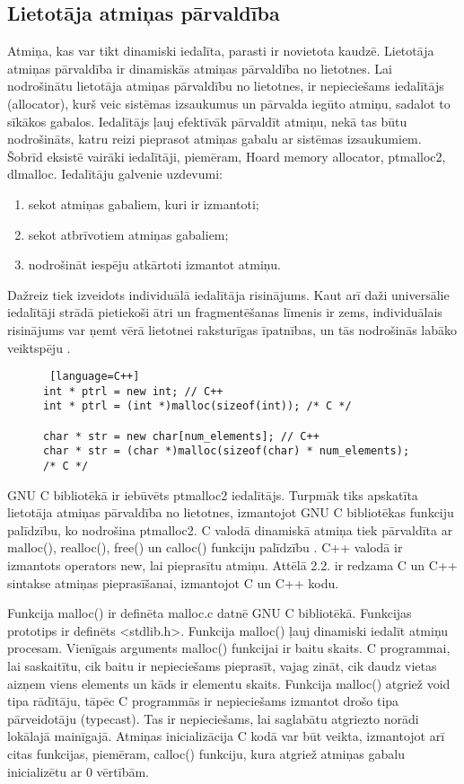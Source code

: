  
\subsection{Lietotāja atmiņas pārvaldība}
Atmiņa, kas var tikt dinamiski iedalīta, parasti ir novietota kaudzē. 
Lietotāja atmiņas pārvaldība ir dinamiskās atmiņas pārvaldība no lietotnes.
Lai nodrošinātu lietotāja atmiņas pārvaldību no lietotnes, ir nepieciešams iedalītājs (allocator), kurš veic sistēmas izsaukumus un pārvalda iegūto atmiņu, sadalot to sīkākos gabalos.
Iedalītājs ļauj efektīvāk pārvaldīt atmiņu, nekā tas būtu nodrošināts, katru reizi pieprasot atmiņas gabalu ar sistēmas izsaukumiem.
Šobrīd eksistē vairāki iedalītāji, piemēram, Hoard memory allocator, ptmalloc2, dlmalloc.
Iedalītāju galvenie uzdevumi: 
\begin{enumerate}
\item sekot atmiņas gabaliem, kuri ir izmantoti;
\item sekot atbrīvotiem atmiņas gabaliem;
\item nodrošināt iespēju atkārtoti izmantot atmiņu.
\end{enumerate}
Dažreiz tiek izveidots individuālā iedalītāja risinājums. 
Kaut arī daži universālie iedalītāji strādā pietiekoši ātri un fragmentēšanas līmenis ir zems, individuālais risinājums var ņemt vērā lietotnei raksturīgas īpatnības, un tās nodrošinās labāko veiktspēju \cite{EDBG}.
\begin{figure}[h]
\begin{lstlisting} [language=C++]
int * ptrl = new int; // C++
int * ptrl = (int *)malloc(sizeof(int)); /* C */

char * str = new char[num_elements]; // C++
char * str = (char *)malloc(sizeof(char) * num_elements); /* C */
\end{lstlisting}
\caption{\textbf{\fontsize{11}{12}\selectfont {Dinamiskās atmiņas iedalīšana C un C++}}}
\end{figure}

GNU C bibliotēkā ir iebūvēts ptmalloc2 iedalītājs.
Turpmāk tiks apskatīta lietotāja atmiņas pārvaldība no lietotnes, izmantojot GNU C bibliotēkas funkciju palīdzību, ko nodrošina ptmalloc2.
C valodā dinamiskā atmiņa tiek pārvaldīta ar malloc(), realloc(), free() un calloc() funkciju palīdzību \cite {PETRSOF}.
C++ valodā ir izmantots operators new, lai pieprasītu atmiņu. 
Attēlā 2.2. ir redzama C un C++ sintakse atmiņas pieprasīšanai, izmantojot C un C++ kodu.


Funkcija malloc() ir definēta malloc.c datnē GNU C bibliotēkā. 
Funkcijas prototips ir definēts <stdlib.h>.
Funkcija malloc() ļauj dinamiski iedalīt atmiņu procesam.
Vienīgais arguments malloc() funkcijai ir baitu skaits.
C programmai, lai saskaitītu, cik baitu ir nepieciešams pieprasīt, vajag zināt, cik daudz vietas aizņem viens elements un kāds ir elementu skaits.
Funkcija malloc() atgriež void tipa rādītāju, tāpēc C programmās ir nepieciešams izmantot drošo tipa pārveidotāju (typecast). 
Tas ir nepieciešams, lai saglabātu atgriezto norādi lokālajā mainīgajā. Atmiņas inicializācija C kodā
var būt veikta, izmantojot arī citas funkcijas, piemēram, calloc() funkciju, kura atgriež atmiņas gabalu inicializētu ar 0 vērtībām.

